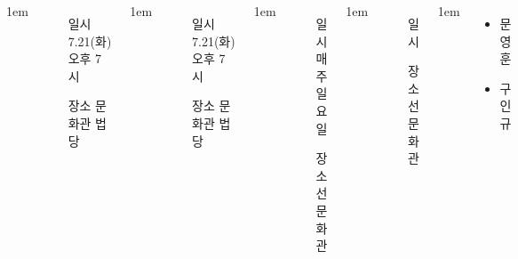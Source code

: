 \documentclass[	20pt, 
							a1paper, 
							portrait, %
							margin=0mm, %
							innermargin=10mm,  		%
							colspace=5mm, 
							subcolspace=0mm
							]{tikzposter}
\begin{document}
\begin{columns}
			{
					\setlength{\leftmargini}{4em}
					\setlength{\labelsep} {1em}
					\begin{itemize}
					\item [일시] 7.21(화) 오후 7시
					\item [장소] 문화관 법당
					\end{itemize}
			}

			{
					\setlength{\leftmargini}{4em}
					\setlength{\labelsep} {1em}
					\begin{itemize}
					\item [일시] 7.21(화) 오후 7시
					\item [장소] 문화관 법당
					\end{itemize}
			}






			{
					\setlength{\leftmargini}{4em}
					\setlength{\labelsep} {1em}
					\begin{itemize}
					\item [일시] 매주 일요일
					\item [장소] 선문화관
					\end{itemize}
			}



			{
					\setlength{\leftmargini}{4em}
					\setlength{\labelsep} {1em}
					\begin{itemize}
					\item [일시] 
					\item [장소] 선문화관
					\end{itemize}
			}


			{
					\setlength{\leftmargini}{4em}
					\setlength{\labelsep} {1em}
					\begin{itemize}
					\item  문영훈 
					\item  구인규 
					\end{itemize}
			} %



\end{columns}
\end{document}
